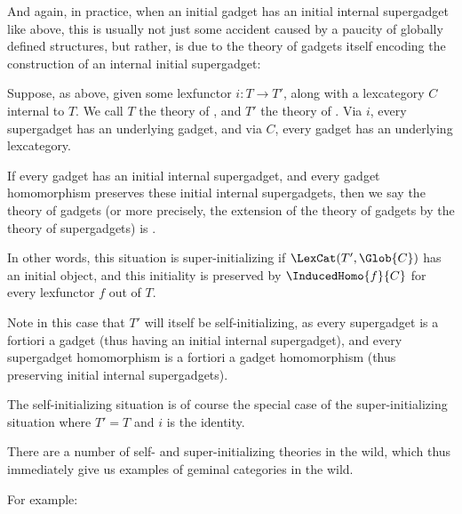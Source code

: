 And again, in practice, when an initial gadget has an initial internal supergadget like above, this is usually not just some accident caused by a paucity of globally defined structures, but rather, is due to the theory of gadgets itself encoding the construction of an internal initial supergadget:

\begin{definition}
Suppose, as above, given some lexfunctor $i : T \to T'$, along with a lexcategory $C$ internal to $T$. We call $T$ the theory of , and $T'$ the theory of . Via $i$, every supergadget has an underlying gadget, and via $C$, every gadget has an underlying lexcategory.

If every gadget has an initial internal supergadget, and every gadget homomorphism preserves these initial internal supergadgets, then we say the theory of gadgets (or more precisely, the extension of the theory of gadgets by the theory of supergadgets) is .

In other words, this situation is super-initializing if $\LexCat(T', \Glob{C})$ has an initial object, and this initiality is preserved by $\InducedHomo{f}{C}$ for every lexfunctor $f$ out of $T$.

Note in this case that $T'$ will itself be self-initializing, as every supergadget is a fortiori a gadget (thus having an initial internal supergadget), and every supergadget homomorphism is a fortiori a gadget homomorphism (thus preserving initial internal supergadgets).
\end{definition}

The self-initializing situation is of course the special case of the super-initializing situation where $T' = T$ and $i$ is the identity.

There are a number of self- and super-initializing theories in the wild, which thus immediately give us examples of geminal categories in the wild.

For example: 


